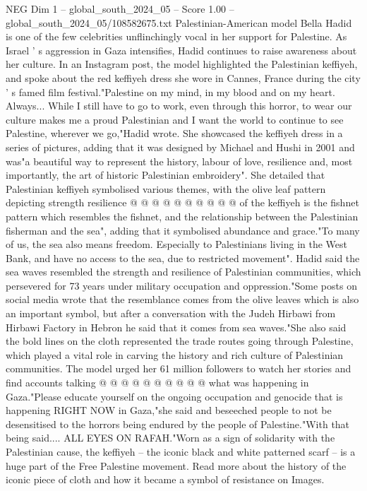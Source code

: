 \begin{textsample}{NEG Dim 1 – global\_south\_2024\_05 – Score 1.00 – global\_south\_2024\_05/108582675.txt}  \label{ex:f1_neg_214}
Palestinian-American model Bella Hadid is one of the few celebrities unflinchingly vocal in her support for Palestine.
As Israel ' s aggression in Gaza intensifies, Hadid continues to raise awareness about her culture.
In an Instagram post, the model highlighted the Palestinian keffiyeh, and spoke about the red keffiyeh dress she wore in Cannes, France during the city ' s famed film festival."Palestine on my mind, in my blood and on my heart.
Always...
While I still have to go to work, even through this horror, to wear our culture makes me a proud Palestinian and I want the world to continue to see Palestine, wherever we go,"Hadid wrote.
She showcased the keffiyeh dress in a series of pictures, adding that it was designed by Michael and Hushi in 2001 and was"a beautiful way to represent the history, labour of love, resilience and, most importantly, the art of historic Palestinian embroidery".
She detailed that Palestinian keffiyeh symbolised various themes, with the olive leaf pattern depicting strength resilience @ @ @ @ @ @ @ @ @ @ of the keffiyeh is the fishnet pattern which resembles the fishnet, and the relationship between the Palestinian fisherman and the sea", adding that it symbolised abundance and grace."To many of us, the sea also means freedom.
Especially to Palestinians living in the West Bank, and have no access to the sea, due to restricted movement".
Hadid said the sea waves resembled the strength and resilience of Palestinian communities, which persevered for 73 years under military occupation and oppression."Some posts on social media wrote that the resemblance comes from the olive leaves which is also an important symbol, but after a conversation with the Judeh Hirbawi from Hirbawi Factory in Hebron he said that it comes from sea waves."She also said the bold lines on the cloth represented the trade routes going through Palestine, which played a vital role in carving the history and rich culture of Palestinian communities.
The model urged her 61 million followers to watch her stories and find accounts talking @ @ @ @ @ @ @ @ @ @ what was happening in Gaza."Please educate yourself on the ongoing occupation and genocide that is happening RIGHT NOW in Gaza,"she said and beseeched people to not be desensitised to the horrors being endured by the people of Palestine."With that being said....
ALL EYES ON RAFAH."Worn as a sign of solidarity with the Palestinian cause, the keffiyeh -- the iconic black and white patterned scarf -- is a huge part of the Free Palestine movement.
Read more about the history of the iconic piece of cloth and how it became a symbol of resistance on Images.

\end{textsample}
